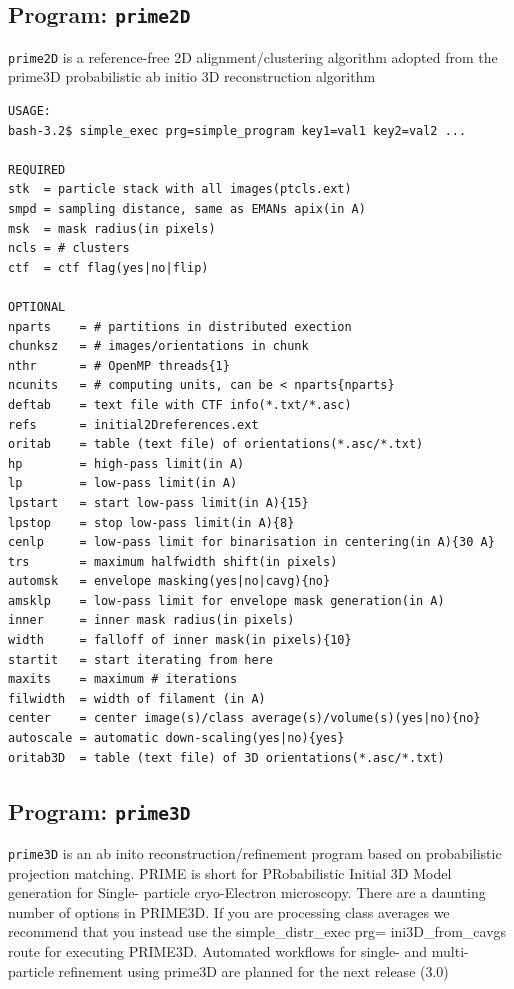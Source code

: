 \documentclass[a4paper,11pt]{article}
\newcommand{\prgname}[1]{\textcolor{NavyBlue}{\texttt{#1}}}
\begin{document}
\subsection{Program: \prgname{prime2D}}
\label{prime2D}
\prgname{prime2D} is a reference-free 2D alignment/clustering algorithm adopted from the prime3D probabilistic ab initio 3D reconstruction algorithm

\begin{verbatim}
USAGE:
bash-3.2$ simple_exec prg=simple_program key1=val1 key2=val2 ...

REQUIRED
stk  = particle stack with all images(ptcls.ext)
smpd = sampling distance, same as EMANs apix(in A)
msk  = mask radius(in pixels)
ncls = # clusters
ctf  = ctf flag(yes|no|flip)

OPTIONAL
nparts    = # partitions in distributed exection
chunksz   = # images/orientations in chunk
nthr      = # OpenMP threads{1}
ncunits   = # computing units, can be < nparts{nparts}
deftab    = text file with CTF info(*.txt/*.asc)
refs      = initial2Dreferences.ext
oritab    = table (text file) of orientations(*.asc/*.txt)
hp        = high-pass limit(in A)
lp        = low-pass limit(in A)
lpstart   = start low-pass limit(in A){15}
lpstop    = stop low-pass limit(in A){8}
cenlp     = low-pass limit for binarisation in centering(in A){30 A}
trs       = maximum halfwidth shift(in pixels)
automsk   = envelope masking(yes|no|cavg){no}
amsklp    = low-pass limit for envelope mask generation(in A)
inner     = inner mask radius(in pixels)
width     = falloff of inner mask(in pixels){10}
startit   = start iterating from here
maxits    = maximum # iterations
filwidth  = width of filament (in A)
center    = center image(s)/class average(s)/volume(s)(yes|no){no}
autoscale = automatic down-scaling(yes|no){yes}
oritab3D  = table (text file) of 3D orientations(*.asc/*.txt)
\end{verbatim}

\subsection{Program: \prgname{prime3D}}
\label{prime3D}
\prgname{prime3D} is an ab inito reconstruction/refinement program based on probabilistic projection matching. PRIME is short for PRobabilistic Initial 3D Model generation for Single- particle cryo-Electron microscopy. There are a daunting number of options in PRIME3D. If you are processing class averages we recommend that you instead use the simple\_distr\_exec prg= ini3D\_from\_cavgs route for executing PRIME3D. Automated workflows for single- and multi-particle refinement using prime3D are planned for the next release (3.0)
\end{document}
